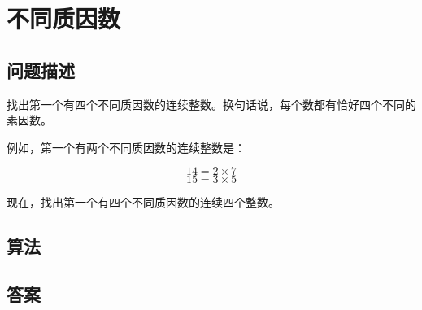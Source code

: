 \section{不同质因数}
\subsection{问题描述}
\begin{tcolorbox}
找出第一个有四个不同质因数的连续整数。换句话说，每个数都有恰好四个不同的素因数。 

例如，第一个有两个不同质因数的连续整数是：

\[
14 = 2 \times 7
\]
\[
15 = 3 \times 5
\]

现在，找出第一个有四个不同质因数的连续四个整数。

\end{tcolorbox}

\subsection{算法}


\subsection{答案}
